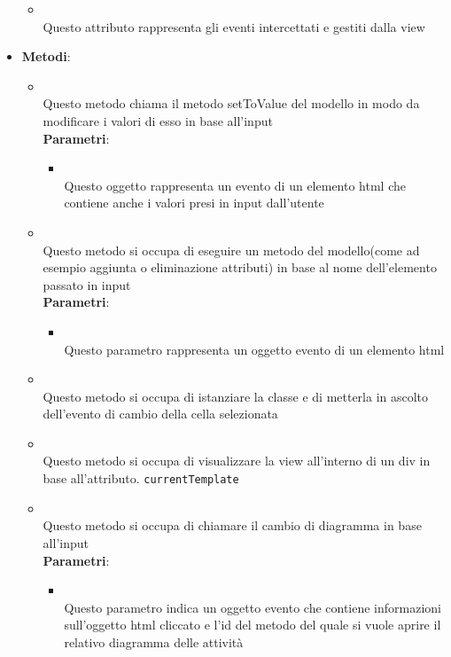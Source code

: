 \begin{itemize}
\begin{itemize}
\item {}
\\ Questo attributo rappresenta gli eventi intercettati e gestiti dalla view
\end{itemize}
\item \textbf{Metodi}:
\begin{itemize}
\item {}
\\ Questo metodo chiama il metodo setToValue del modello in modo da modificare i valori di esso in base all'input
\\ \textbf{Parametri}:
\begin{itemize}
\item {}
\\ Questo oggetto rappresenta un evento di un elemento html che contiene anche i valori presi in input dall'utente
\end{itemize}
\item {}
\\ Questo metodo si occupa di eseguire un metodo del modello(come ad esempio aggiunta o eliminazione attributi) in base al nome dell'elemento passato in input
\\ \textbf{Parametri}:
\begin{itemize}
\item {}
\\ Questo parametro rappresenta un oggetto evento di un elemento html
\end{itemize}
\item {}
\\ Questo metodo si occupa di istanziare la classe e di metterla in ascolto dell'evento di cambio della cella selezionata
\item {}
\\ Questo metodo si occupa di visualizzare la view all'interno di un div in base all'attributo. \texttt{currentTemplate}
\item {}
\\ Questo metodo si occupa di chiamare il cambio di diagramma in base all'input
\\ \textbf{Parametri}:
\begin{itemize}
\item {}
\\ Questo parametro indica un oggetto evento che contiene informazioni sull'oggetto html cliccato e l'id del metodo del quale si vuole aprire il relativo diagramma delle attività

\end{itemize}
\end{itemize}
\end{itemize}
